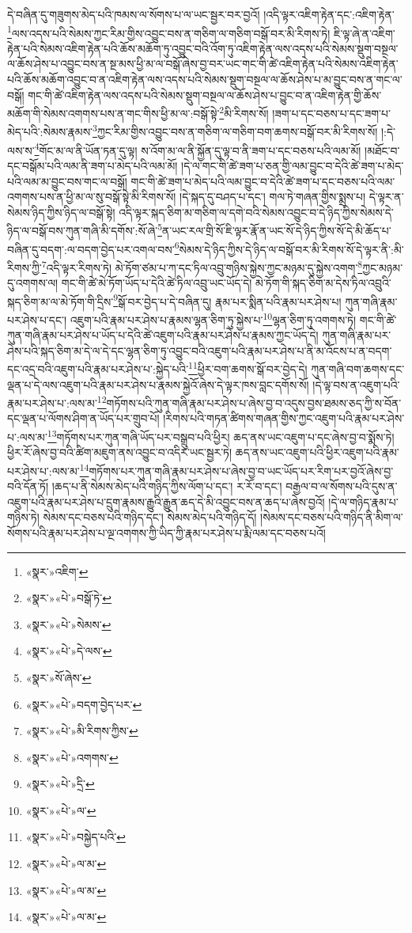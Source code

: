 དེ་བཞིན་དུ་གཟུགས་མེད་པའི་ཁམས་ལ་སོགས་པ་ལ་ཡང་སྦྱར་བར་བྱའོ། །འདི་ལྟར་འཇིག་རྟེན་དང་:འཇིག་རྟེན་\footnote{«སྣར་»འཇིག་}ལས་འདས་པའི་སེམས་ཀྱང་རིམ་གྱིས་འབྱུང་བས་ན་གཅིག་ལ་གཅིག་བསྒོ་བར་མི་རིགས་ཏེ། ཇི་ལྟ་ཞེ་ན་འཇིག་རྟེན་པའི་སེམས་འཇིག་རྟེན་པའི་ཆོས་མཆོག་ཏུ་འབྱུང་བའི་འོག་ཏུ་འཇིག་རྟེན་ལས་འདས་པའི་སེམས་སྡུག་བསྔལ་ལ་ཆོས་ཤེས་པ་འབྱུང་བས་ན་སྔ་མས་ཕྱི་མ་ལ་བསྒོ་ཞེས་བྱ་བར་ཡང་གང་གི་ཚེ་འཇིག་རྟེན་པའི་སེམས་འཇིག་རྟེན་པའི་ཆོས་མཆོག་འབྱུང་བ་ན་འཇིག་རྟེན་ལས་འདས་པའི་སེམས་སྡུག་བསྔལ་ལ་ཆོས་ཤེས་པ་མ་བྱུང་བས་ན་གང་ལ་བསྒོ། གང་གི་ཚེ་འཇིག་རྟེན་ལས་འདས་པའི་སེམས་སྡུག་བསྔལ་ལ་ཆོས་ཤེས་པ་བྱུང་བ་ན་འཇིག་རྟེན་གྱི་ཆོས་མཆོག་གི་སེམས་འགགས་པས་ན་གང་གིས་ཕྱི་མ་ལ་:བསྒོ་སྟེ་\footnote{«སྣར་»«པེ་»བསྒོ་ཏེ་}མི་རིགས་སོ། །ཟག་པ་དང་བཅས་པ་དང་ཟག་པ་མེད་པའི་:སེམས་རྣམས་\footnote{«སྣར་»«པེ་»སེམས་}ཀྱང་རིམ་གྱིས་འབྱུང་བས་ན་གཅིག་ལ་གཅིག་བག་ཆགས་བསྒོ་བར་མི་རིགས་སོ། །:དེ་ལས་ས་\footnote{«སྣར་»«པེ་»དེ་ལས་}གོང་མ་ལ་ནི་ཡོན་ཏན་དུ་ལྟ། ས་འོག་མ་ལ་ནི་སྐྱོན་དུ་ལྟ་བ་ནི་ཟག་པ་དང་བཅས་པའི་ལམ་མོ། །མཐོང་བ་དང་བསྒོམ་པའི་ལམ་ནི་ཟག་པ་མེད་པའི་ལམ་མོ། །དེ་ལ་གང་གི་ཚེ་ཟག་པ་ཅན་གྱི་ལམ་བྱུང་བ་དེའི་ཚེ་ཟག་པ་མེད་པའི་ལམ་མ་བྱུང་བས་གང་ལ་བསྒོ། གང་གི་ཚེ་ཟག་པ་མེད་པའི་ལམ་བྱུང་བ་དེའི་ཚེ་ཟག་པ་དང་བཅས་པའི་ལམ་འགགས་པས་ན་ཕྱི་མ་ལ་སུ་བསྒོ་སྟེ་མི་རིགས་སོ། །དེ་སྐད་དུ་བཤད་པ་དང་། གལ་ཏེ་གཞན་གྱིས་སྨྲས་པ། དེ་ལྟར་ན་སེམས་ཉིད་ཀྱིས་ཉིད་ལ་བསྒོ་སྟེ། འདི་ལྟར་སྐད་ཅིག་མ་གཅིག་ལ་དགེ་བའི་སེམས་འབྱུང་བ་དེ་ཉིད་ཀྱིས་སེམས་དེ་ཉིད་ལ་བསྒོ་བས་ཀུན་གཞི་མི་དགོས་:སོ་ཞེ་\footnote{«སྣར་»སོ་ཞེས་}ན་ཡང་རལ་གྲི་སོ་ཇི་ལྟར་རྣོ་ན་ཡང་སོ་དེ་ཉིད་ཀྱིས་སོ་དེ་མི་ཆོད་པ་བཞིན་དུ་བདག་:ལ་བདག་བྱེད་པར་འགལ་བས་\footnote{«སྣར་»«པེ་»བདག་བྱེད་པར་}སེམས་དེ་ཉིད་ཀྱིས་དེ་ཉིད་ལ་བསྒོ་བར་མི་རིགས་སོ་དེ་ལྟར་ནི་:མི་རིགས་ཀྱི་\footnote{«སྣར་»«པེ་»མི་རིགས་ཀྱིས་}འདི་ལྟར་རིགས་ཏེ། མེ་ཏོག་ཙམ་པ་ཀ་དང་ཏིལ་འབྲུ་གཉིས་སྐྱེས་ཀྱང་མཉམ་དུ་སྐྱེས་འགག་\footnote{«སྣར་»«པེ་»འགགས་}ཀྱང་མཉམ་དུ་འགགས་ལ། གང་གི་ཚེ་མེ་ཏོག་ཡོད་པ་དེའི་ཚེ་ཏིལ་འབྲུ་ཡང་ཡོད་དེ། མེ་ཏོག་གི་སྐད་ཅིག་མ་དེས་ཏིལ་འབྲུའི་སྐད་ཅིག་མ་ལ་མེ་ཏོག་གི་དྲིས་\footnote{«སྣར་»«པེ་»དྲི་}སྒོ་བར་བྱེད་པ་དེ་བཞིན་དུ། རྣམ་པར་སྨིན་པའི་རྣམ་པར་ཤེས་པ། ཀུན་གཞི་རྣམ་པར་ཤེས་པ་དང་། འཇུག་པའི་རྣམ་པར་ཤེས་པ་རྣམས་ལྷན་ཅིག་ཏུ་སྐྱེས་པ་\footnote{«སྣར་»«པེ་»ལ་}ལྷན་ཅིག་ཏུ་འགགས་ཏེ། གང་གི་ཚེ་ཀུན་གཞི་རྣམ་པར་ཤེས་པ་ཡོད་པ་དེའི་ཚེ་འཇུག་པའི་རྣམ་པར་ཤེས་པ་རྣམས་ཀྱང་ཡོད་དེ། ཀུན་གཞི་རྣམ་པར་ཤེས་པའི་སྐད་ཅིག་མ་དེ་ལ་དེ་དང་ལྷན་ཅིག་ཏུ་འབྱུང་བའི་འཇུག་པའི་རྣམ་པར་ཤེས་པ་ནི་མ་འོངས་པ་ན་བདག་དང་འདྲ་བའི་འཇུག་པའི་རྣམ་པར་ཤེས་པ་:སྐྱེད་པའི་\footnote{«སྣར་»«པེ་»བསྐྱེད་པའི་}ཕྱིར་བག་ཆགས་སྒོ་བར་བྱེད་དེ། ཀུན་གཞི་བག་ཆགས་དང་ལྡན་པ་དེ་ལས་འཇུག་པའི་རྣམ་པར་ཤེས་པ་རྣམས་སྐྱེའོ་ཞེས་དེ་ལྟར་ཁས་བླང་དགོས་སོ། །དེ་ལྟ་བས་ན་འཇུག་པའི་རྣམ་པར་ཤེས་པ་:ལས་མ་\footnote{«སྣར་»«པེ་»ལ་མ་}གཏོགས་པའི་ཀུན་གཞི་རྣམ་པར་ཤེས་པ་ཞེས་བྱ་བ་འདུས་བྱས་ཐམས་ཅད་ཀྱི་ས་བོན་དང་ལྡན་པ་ལོགས་ཤིག་ན་ཡོད་པར་གྲུབ་པོ། །རིགས་པའི་གཏན་ཚིགས་གཞན་གྱིས་ཀྱང་འཇུག་པའི་རྣམ་པར་ཤེས་པ་:ལས་མ་\footnote{«སྣར་»«པེ་»ལ་མ་}གཏོགས་པར་ཀུན་གཞི་ཡོད་པར་བསྒྲུབ་པའི་ཕྱིར། ཆད་ནས་ཡང་འཇུག་པ་དང་ཞེས་བྱ་བ་སྨོས་ཏེ། ཕྱིར་རོ་ཞེས་བྱ་བའི་ཚིག་མཇུག་ནས་འབྱུང་བ་འདིར་ཡང་སྦྱར་ཏེ། ཆད་ནས་ཡང་འཇུག་པའི་ཕྱིར་འཇུག་པའི་རྣམ་པར་ཤེས་པ་:ལས་མ་\footnote{«སྣར་»«པེ་»ལ་མ་}གཏོགས་པར་ཀུན་གཞི་རྣམ་པར་ཤེས་པ་ཞེས་བྱ་བ་ཡང་ཡོད་པར་རིག་པར་བྱའོ་ཞེས་བྱ་བའི་དོན་ཏོ། །ཆད་པ་ནི་སེམས་མེད་པའི་གཉིད་ཀྱིས་ལོག་པ་དང་། ར་རོ་བ་དང་། བརྒྱལ་བ་ལ་སོགས་པའི་དུས་ན་འཇུག་པའི་རྣམ་པར་ཤེས་པ་དྲུག་རྣམས་རྒྱུའི་རྒྱུན་ཆད་དེ་མི་འབྱུང་བས་ན་ཆད་པ་ཞེས་བྱའོ། །དེ་ལ་གཉིད་རྣམ་པ་གཉིས་ཏེ། སེམས་དང་བཅས་པའི་གཉིད་དང་། སེམས་མེད་པའི་གཉིད་དོ། །སེམས་དང་བཅས་པའི་གཉིད་ནི་མིག་ལ་སོགས་པའི་རྣམ་པར་ཤེས་པ་ལྔ་འགགས་ཀྱི་ཡིད་ཀྱི་རྣམ་པར་ཤེས་པ་རྨི་ལམ་དང་བཅས་པའོ། 